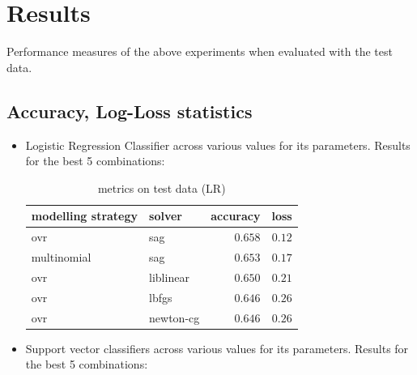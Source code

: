 \documentclass[fleqn,10pt]{SelfArx} %
\begin{document}



\section{Results}

Performance measures of the above experiments when evaluated with the test data.

\subsection{Accuracy, Log-Loss statistics}
\begin{itemize}
\item Logistic Regression Classifier across various values for its parameters. Results for the best 5 combinations:
  \begin{table}[H]
    \caption{metrics on test data (LR)}
    \centering
    \begin{tabular}{llrr}
      \toprule
      modelling strategy & solver & accuracy & loss \\
      \midrule
      ovr & sag & $0.658$ & $0.12$ \\
      multinomial & sag & $0.653$ & $0.17$ \\
      ovr & liblinear & $0.650$ & $0.21$ \\
      ovr & lbfgs & $0.646$ & $0.26$ \\
      ovr & newton-cg & $0.646$ & $0.26$ \\
      \bottomrule
    \end{tabular}
  \end{table}

\item Support vector classifiers across various values for its parameters. Results for the best 5 combinations:


\end{itemize}
\end{document}
